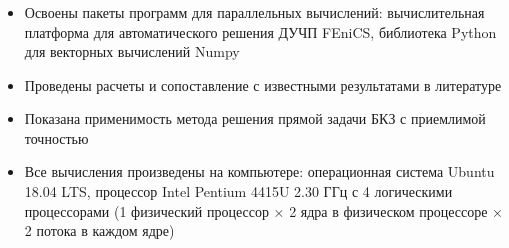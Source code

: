 \begin{frame}
\frametitle{\insertsection}

\begin{itemize}
    \item Освоены пакеты программ для параллельных вычислений: вычислительная платформа для автоматического решения ДУЧП FEniCS, библиотека Python для векторных вычислений Numpy
    \item Проведены расчеты и сопоставление с известными результатами в литературе
    \item Показана применимость метода решения прямой задачи БКЗ с приемлимой точностью
    \item Все вычисления произведены на компьютере: операционная система
    Ubuntu 18.04 LTS, процессор Intel Pentium 4415U 2.30 ГГц с 4 логическими
    процессорами (1 физический процессор × 2 ядра в физическом процессоре ×
    2 потока в каждом ядре)
\end{itemize}

\end{frame}

